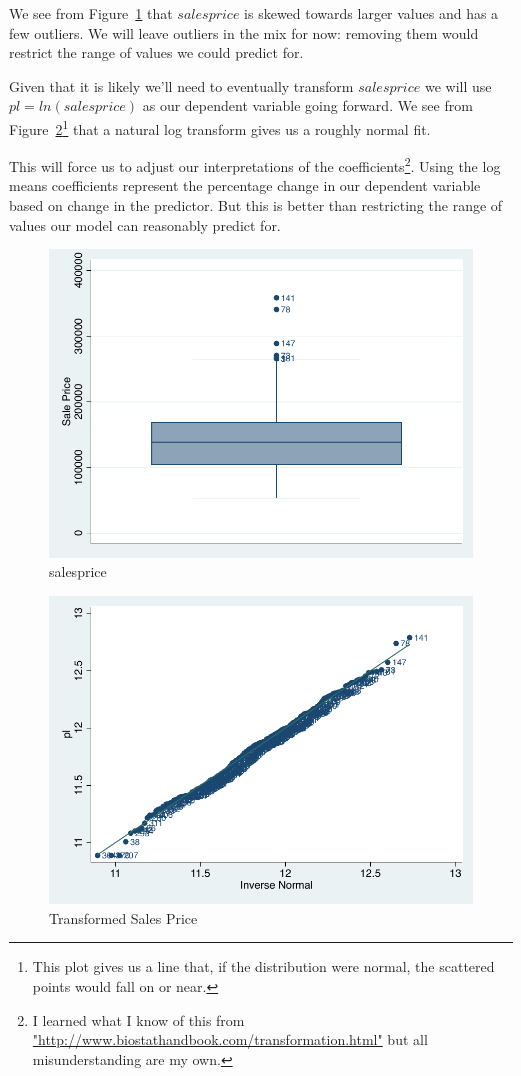 \documentclass[twocolumn,11pt]{article}
\begin{document}
We see from Figure~\ref{fig:salesprice-box} that
$salesprice$ is skewed towards larger values and has a few outliers.
We will leave outliers in the mix for now:
removing them would restrict the range of values we could predict for.

Given that it is likely we'll need to eventually transform $salesprice$
we will use $pl = ln(salesprice)$ as our dependent variable going forward.
We see from Figure~\ref{fig:pl-qnorm}\footnote{This plot gives
us a line that, if the distribution were normal, the scattered points would fall on or near.}
that a natural log transform gives us a roughly normal fit.

This will force us to adjust our interpretations of the coefficients\footnote{I learned what
I know of this from  \url{"http://www.biostathandbook.com/transformation.html"} but all misunderstanding are my own.}.
Using the log means coefficients represent the percentage change in our dependent variable based on change in the predictor.
But this is better than restricting the range of values our model can reasonably predict for.
\begin{figure}[H]
\centering
  \includegraphics[width=.9\linewidth]{figures/salesprice-box.pdf}
  \caption{salesprice}
  \label{fig:salesprice-box}
\end{figure}
\begin{figure}[H]
  \centering
  \includegraphics[width=.9\linewidth]{figures/pl-qnorm.pdf}
  \caption{Transformed Sales Price}
  \label{fig:pl-qnorm}
\end{figure}
\end{document}
